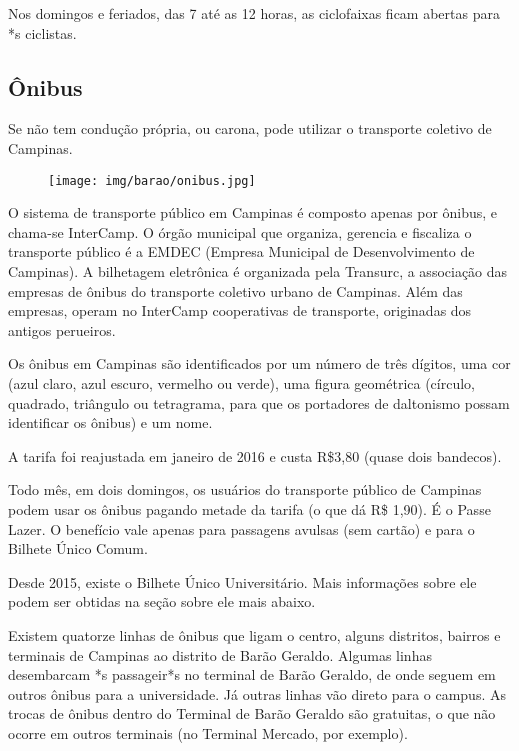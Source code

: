 Nos domingos e feriados, das 7 até as 12 horas, as ciclofaixas ficam abertas
para *s ciclistas.

\subsection{Ônibus}

Se não tem condução própria, ou carona, pode utilizar o transporte coletivo de
Campinas.

\begin{figure}[h!]  \centering
    \texttt{[image: img/barao/onibus.jpg]}
\end{figure}

O sistema de transporte público em Campinas é composto apenas por ônibus, e
chama-se InterCamp. O órgão municipal que organiza, gerencia e fiscaliza o
transporte público é a EMDEC (Empresa Municipal de Desenvolvimento de Campinas).
A bilhetagem eletrônica é organizada pela Transurc, a associação das empresas de
ônibus do transporte coletivo urbano de Campinas. Além das empresas, operam no
InterCamp cooperativas de transporte, originadas dos antigos perueiros.

Os ônibus em Campinas são identificados por um número de três dígitos, uma cor
(azul claro, azul escuro, vermelho ou verde), uma figura geométrica (círculo,
quadrado, triângulo ou tetragrama, para que os portadores de daltonismo possam
identificar os ônibus) e um nome.

A tarifa foi reajustada em janeiro de 2016 e custa R\$3,80 (quase dois bandecos).

Todo mês, em dois domingos, os usuários do transporte público de Campinas podem
usar os ônibus pagando metade da tarifa (o que dá R\$ 1,90). É o Passe Lazer. O
benefício vale apenas para passagens avulsas (sem cartão) e para o Bilhete
Único Comum.

Desde 2015, existe o Bilhete Único Universitário. Mais informações sobre ele
podem ser obtidas na seção sobre ele mais abaixo.

Existem quatorze linhas de ônibus que ligam o centro, alguns distritos, bairros e
terminais de Campinas ao distrito de Barão Geraldo. Algumas linhas desembarcam
*s passageir*s no terminal de Barão Geraldo, de onde seguem em outros ônibus
para a universidade. Já outras linhas vão direto para o campus. As trocas de
ônibus dentro do Terminal de Barão Geraldo são gratuitas, o que não ocorre em
outros terminais (no Terminal Mercado, por exemplo).

